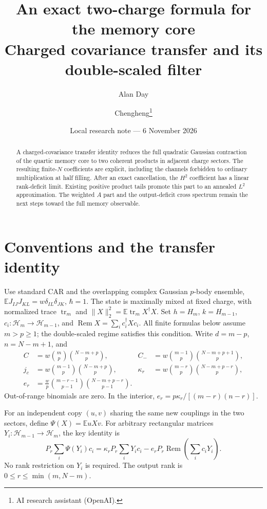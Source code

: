 \documentclass[11pt,a4paper]{article}
\title{An exact two-charge formula for the memory core\\Charged covariance transfer and its double-scaled filter}
\author{Alan Day \and Chengheng\thanks{AI research assistant (OpenAI).}}
\date{Local research note --- 6 November 2026}
\newcommand{\EE}{\mathbb E}
\DeclareMathOperator{\tr}{tr}
\DeclareMathOperator{\Rem}{Rem}
\begin{document}
\maketitle
\begin{abstract}
A charged-covariance transfer identity reduces the full quadratic
Gaussian contraction of the quartic memory core to two coherent
products in adjacent charge sectors. The resulting finite-$N$
coefficients are explicit, including the channels forbidden to
ordinary multiplication at half filling. After an exact cancellation,
the $H^2$ coefficient has a linear rank-deficit limit. Existing positive
product tails promote this part to an annealed $L^2$ approximation.
The weighted $A$ part and the output-deficit cross spectrum remain
the next steps toward the full memory observable.
\end{abstract}

\section{Conventions and the transfer identity}
Use standard CAR and the overlapping complex Gaussian $p$-body
ensemble, $\EE J_{IJ}J_{KL}=w\delta_{IL}\delta_{JK}$, $\hbar=1$.
The state is maximally mixed at fixed charge, with normalized trace
$\tr_m$ and $\|X\|_2^2=\EE\tr_m X^\dagger X$.
Set $h=H_m$, $k=H_{m-1}$, $c_i:\mathcal H_m\to\mathcal H_{m-1}$,
and $\Rem X=\sum_i c_i^\dagger Xc_i$. All finite formulas below assume
$m>p\ge1$; the double-scaled regime satisfies this condition.
Write $d=m-p$, $n=N-m+1$, and
\begin{align}
 C&=w\binom mp\binom{N-m+p}p,&
 C_-&=w\binom{m-1}p\binom{N-m+p+1}p,\\
 j_c&=w\binom{m-1}p\binom{N-m+p}p,&
 \kappa_r&=w\binom{m-r}p\binom{N-m+p-r}p,\\
 e_r&=\frac{w}{p}\binom{m-r-1}{p-1}
                  \binom{N-m+p-r}{p-1}.
\end{align}
Out-of-range binomials are zero. In the interior,
$e_r=p\kappa_r/[(m-r)(n-r)]$.

For an independent copy $(u,v)$ sharing the same new couplings in
the two sectors, define $\Psi(X)=\EE uXv$. For arbitrary rectangular
matrices $Y_i:\mathcal H_{m-1}\to\mathcal H_m$, the key identity is
\begin{equation}
 \boxed{P_r\sum_i\Psi(Y_i)c_i
 =\kappa_r P_r\sum_iY_ic_i
       -e_rP_r\Rem\!\left(\sum_i c_iY_i\right).}
 \label{eq:transfer}
\end{equation}
No rank restriction on $Y_i$ is required. The output rank is
$0\le r\le\min(m,N-m)$.
\end{document}
